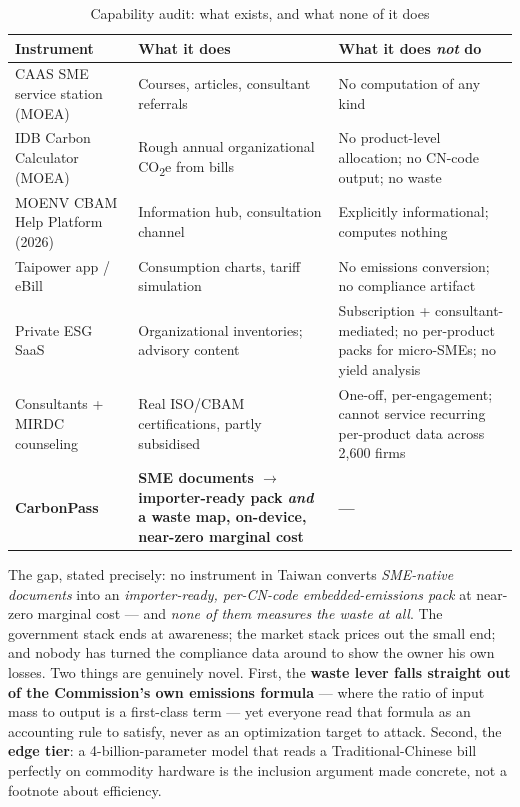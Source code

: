 \documentclass[11pt]{article}
\begin{document}
\begin{table}[h]
\caption{Capability audit: what exists, and what none of it does}
\label{tab:audit}
\small
\begin{tabularx}{\textwidth}{l Y Y}
\toprule
\textbf{Instrument} & \textbf{What it does} & \textbf{What it does \emph{not} do} \\
\midrule
CAAS SME service station (MOEA) & Courses, articles, consultant referrals & No computation of any kind \\
IDB Carbon Calculator (MOEA) & Rough annual organizational CO\textsubscript{2}e from bills & No product-level allocation; no CN-code output; no waste \\
MOENV CBAM Help Platform (2026) & Information hub, consultation channel & Explicitly informational; computes nothing \\
Taipower app / eBill & Consumption charts, tariff simulation & No emissions conversion; no compliance artifact \\
Private ESG SaaS & Organizational inventories; advisory content & Subscription + consultant-mediated; no per-product packs for micro-SMEs; no yield analysis \\
Consultants + MIRDC counseling & Real ISO/CBAM certifications, partly subsidised & One-off, per-engagement; cannot service recurring per-product data across 2{,}600 firms \\
\textbf{CarbonPass} & \textbf{SME documents $\rightarrow$ importer-ready pack \emph{and} a waste map, on-device, near-zero marginal cost} & \textbf{---} \\
\bottomrule
\end{tabularx}
\end{table}

The gap, stated precisely: no instrument in Taiwan converts \emph{SME-native documents} into an \emph{importer-ready, per-CN-code embedded-emissions pack} at near-zero marginal cost --- and \emph{none of them measures the waste at all}. The government stack ends at awareness; the market stack prices out the small end; and nobody has turned the compliance data around to show the owner his own losses. Two things are genuinely novel. First, the \textbf{waste lever falls straight out of the Commission's own emissions formula} --- where the ratio of input mass to output is a first-class term --- yet everyone read that formula as an accounting rule to satisfy, never as an optimization target to attack. Second, the \textbf{edge tier}: a 4-billion-parameter model that reads a Traditional-Chinese bill perfectly on commodity hardware is the inclusion argument made concrete, not a footnote about efficiency.
\end{document}
